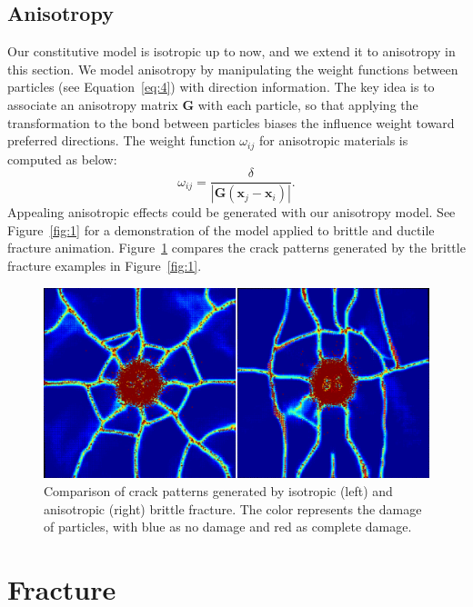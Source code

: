 \subsection{Anisotropy}

Our constitutive model is isotropic up to now, and we extend it to anisotropy in this section. We model anisotropy by manipulating the weight functions between particles (see Equation~\ref{eq:4}) with direction information. The key idea is to associate an anisotropy matrix $\mathbf{G}$ with each particle, so that applying the transformation to the bond between particles biases the influence weight toward preferred directions. The weight function $\omega_{ij}$ for anisotropic materials is computed as below:
\begin{equation}
\omega_{ij}=\frac{\delta}{|\mathbf{G}(\mathbf{x}_j-\mathbf{x}_i)|}.
\label{eq:16}
\end{equation}
Appealing anisotropic effects could be generated with our anisotropy model. See Figure~\ref{fig:1} for a demonstration of the model applied to brittle and ductile fracture animation. Figure~\ref{fig:6} compares the crack patterns generated by the brittle fracture examples in Figure~\ref{fig:1}.

\begin{figure}[t]
  \centering
  \includegraphics[width=\linewidth, bb=0 0 1400 700]{../figs/demo_impact_color_map.png}
  \caption{\label{fig:6}
  Comparison of crack patterns generated by isotropic (left) and anisotropic (right) brittle fracture. The color represents the damage of particles, with blue as no damage and red as complete damage.
}
\end{figure}
\section{Fracture}

